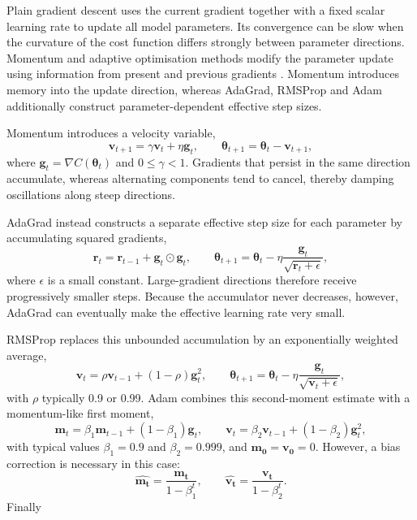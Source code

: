 \documentclass[aps,rmp,reprint,amsmath,amssymb,graphicx,longbibliography]{revtex4-1}
\begin{document}
Plain gradient descent uses the current gradient together with a fixed scalar
learning rate to update all model parameters. Its convergence can be slow
when the curvature of the cost function differs strongly between parameter
directions. Momentum and adaptive optimisation methods modify the parameter
update using information from present and previous gradients
\cite{HjorthJensen2026MLPSCh4}. Momentum introduces memory into the update
direction, whereas AdaGrad, RMSProp and Adam additionally construct
parameter-dependent effective step sizes.

Momentum introduces a velocity variable,
\begin{equation}
    \mathbf{v}_{t+1}
    =
    \gamma\mathbf{v}_t
    +
    \eta\mathbf{g}_t,
    \qquad
    \boldsymbol{\theta}_{t+1}
    =
    \boldsymbol{\theta}_t-\mathbf{v}_{t+1},
\end{equation}
where $\mathbf{g}_t=\nabla C(\boldsymbol{\theta}_t)$ and
$0\leq\gamma<1$. Gradients that persist in the same direction accumulate,
whereas alternating components tend to cancel, thereby damping oscillations
along steep directions.

AdaGrad instead constructs a separate effective step size for each parameter
by accumulating squared gradients,
\begin{equation}
    \mathbf{r}_t
    =
    \mathbf{r}_{t-1}
    +
    \mathbf{g}_t\odot\mathbf{g}_t,
    \qquad
    \boldsymbol{\theta}_{t+1}
    =
    \boldsymbol{\theta}_t
    -
    \eta
    \frac{\mathbf{g}_t}
         {\sqrt{\mathbf{r}_t+\epsilon}},
\end{equation}
where $\epsilon$ is a small constant. Large-gradient directions therefore receive progressively smaller steps. Because the accumulator never decreases, however, AdaGrad can eventually make the effective learning rate very small.

RMSProp replaces this unbounded accumulation by an exponentially weighted average,
\begin{equation}
    \mathbf{v}_t
    =
    \rho\mathbf{v}_{t-1}
    +
    (1-\rho)\mathbf{g}_t^2,
    \qquad
    \boldsymbol{\theta}_{t+1}
    =
    \boldsymbol{\theta}_t
    -
    \eta
    \frac{\mathbf{g}_t}
         {\sqrt{\mathbf{v}_t+\epsilon}},
\end{equation}
with $\rho$ typically 0.9 or 0.99. Adam combines this second-moment estimate with a momentum-like first moment,
\begin{equation}
    \mathbf{m}_t
    =
    \beta_1\mathbf{m}_{t-1}
    +(1-\beta_1)\mathbf{g}_t,
    \qquad
    \mathbf{v}_t
    =
    \beta_2\mathbf{v}_{t-1}
    +(1-\beta_2)\mathbf{g}_t^2,
\end{equation}
with typical values $\beta_1 = 0.9$ and $\beta_2 = 0.999$, and $\mathbf{m_0} = \mathbf{v_0} = 0$. However, a bias correction is necessary in this case: 
\begin{equation}
    \hat{\mathbf{m_t}}=\frac{\mathbf{m_t}}{1-\beta_1^t},
    \qquad
    \hat{\mathbf{v_t}}=\frac{\mathbf{v_t}}{1-\beta_2^t}.
\end{equation}
Finally 
\end{document}
